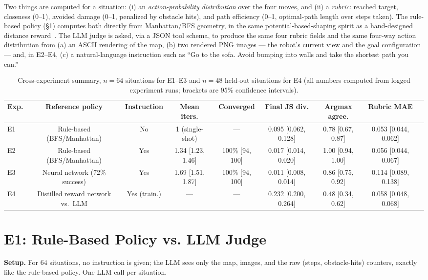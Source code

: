 \documentclass[10pt,conference]{IEEEtran}
\begin{document}
Two things are computed for a situation: (i) an \emph{action-probability
distribution} over the four moves, and (ii) a \emph{rubric}: reached
target, closeness (0--1), avoided damage (0--1, penalized by obstacle
hits), and path efficiency (0--1, optimal-path length over steps taken).
The rule-based policy (\S\ref{sec:e1}) computes both directly from
Manhattan/BFS geometry, in the same potential-based-shaping spirit as a
hand-designed distance reward~\citep{ng1999shaping}. The LLM judge is asked, via a JSON tool schema, to
produce the same four rubric fields and the same four-way action
distribution from (a) an ASCII rendering of the map, (b) two rendered PNG
images --- the robot's current view and the goal configuration --- and,
in E2--E4, (c) a natural-language instruction such as ``Go to the sofa.
Avoid bumping into walls and take the shortest path you can.''

\begin{table}[t]
\centering
\caption{Cross-experiment summary, $n=64$ situations for E1--E3 and $n=48$ held-out situations for E4
(all numbers computed from logged experiment runs; brackets are 95\% confidence intervals).}
\label{tab:summary}
\begin{tabular}{lcccccccc}
\toprule
Exp. & Reference policy & Instruction & Mean iters. & Converged & Final JS div. & Argmax agree. & Rubric MAE \\
\midrule
E1 & Rule-based (BFS/Manhattan) & No & 1 (single-shot) & --- & 0.095 [0.062, 0.128] & 0.78 [0.67, 0.87] & 0.053 [0.044, 0.062] \\
E2 & Rule-based (BFS/Manhattan) & Yes & 1.34 [1.23, 1.46] & 100\% [94, 100] & 0.017 [0.014, 0.020] & 1.00 [0.94, 1.00] & 0.056 [0.044, 0.067] \\
E3 & Neural network (72\% success) & Yes & 1.69 [1.51, 1.87] & 100\% [94, 100] & 0.011 [0.008, 0.014] & 0.86 [0.75, 0.92] & 0.114 [0.089, 0.138] \\
E4 & Distilled reward network vs.\ LLM & Yes (train.) & --- & --- & 0.232 [0.200, 0.264] & 0.48 [0.34, 0.62] & 0.058 [0.048, 0.068] \\
\bottomrule
\end{tabular}
\end{table}

\section{E1: Rule-Based Policy vs. LLM Judge}
\label{sec:e1}
\textbf{Setup.} For 64 situations, no instruction is given; the LLM sees
only the map, images, and the raw (steps, obstacle-hits) counters,
exactly like the rule-based policy. One LLM call per situation.
\end{document}
